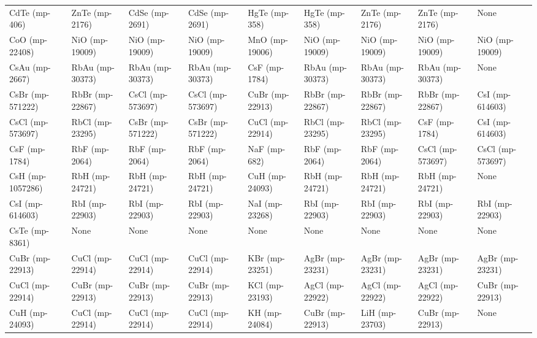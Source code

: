 \begin{longtable}{lllllllll}
    CdTe (mp-406) &    ZnTe (mp-2176) &      CdSe (mp-2691) &    CdSe (mp-2691) &       HgTe (mp-358) &     HgTe (mp-358) &    ZnTe (mp-2176) &    ZnTe (mp-2176) &              None \\
   CoO (mp-22408) &    NiO (mp-19009) &      NiO (mp-19009) &    NiO (mp-19009) &      MnO (mp-19006) &    NiO (mp-19009) &    NiO (mp-19009) &    NiO (mp-19009) &    NiO (mp-19009) \\
   CsAu (mp-2667) &   RbAu (mp-30373) &     RbAu (mp-30373) &   RbAu (mp-30373) &       CsF (mp-1784) &   RbAu (mp-30373) &   RbAu (mp-30373) &   RbAu (mp-30373) &              None \\
 CsBr (mp-571222) &   RbBr (mp-22867) &    CsCl (mp-573697) &  CsCl (mp-573697) &     CuBr (mp-22913) &   RbBr (mp-22867) &   RbBr (mp-22867) &   RbBr (mp-22867) &   CsI (mp-614603) \\
 CsCl (mp-573697) &   RbCl (mp-23295) &    CsBr (mp-571222) &  CsBr (mp-571222) &     CuCl (mp-22914) &   RbCl (mp-23295) &   RbCl (mp-23295) &     CsF (mp-1784) &   CsI (mp-614603) \\
    CsF (mp-1784) &     RbF (mp-2064) &       RbF (mp-2064) &     RbF (mp-2064) &        NaF (mp-682) &     RbF (mp-2064) &     RbF (mp-2064) &  CsCl (mp-573697) &  CsCl (mp-573697) \\
 CsH (mp-1057286) &    RbH (mp-24721) &      RbH (mp-24721) &    RbH (mp-24721) &      CuH (mp-24093) &    RbH (mp-24721) &    RbH (mp-24721) &    RbH (mp-24721) &              None \\
  CsI (mp-614603) &    RbI (mp-22903) &      RbI (mp-22903) &    RbI (mp-22903) &      NaI (mp-23268) &    RbI (mp-22903) &    RbI (mp-22903) &    RbI (mp-22903) &    RbI (mp-22903) \\
   CsTe (mp-8361) &              None &                None &              None &                None &              None &              None &              None &              None \\
  CuBr (mp-22913) &   CuCl (mp-22914) &     CuCl (mp-22914) &   CuCl (mp-22914) &      KBr (mp-23251) &   AgBr (mp-23231) &   AgBr (mp-23231) &   AgBr (mp-23231) &   AgBr (mp-23231) \\
  CuCl (mp-22914) &   CuBr (mp-22913) &     CuBr (mp-22913) &   CuBr (mp-22913) &      KCl (mp-23193) &   AgCl (mp-22922) &   AgCl (mp-22922) &   AgCl (mp-22922) &   CuBr (mp-22913) \\
   CuH (mp-24093) &   CuCl (mp-22914) &     CuCl (mp-22914) &   CuCl (mp-22914) &       KH (mp-24084) &   CuBr (mp-22913) &    LiH (mp-23703) &   CuBr (mp-22913) &              None \\

\end{longtable}

